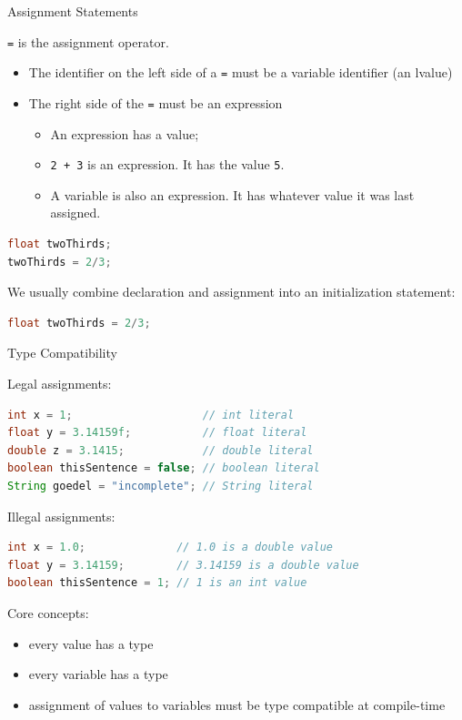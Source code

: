 \documentclass{beamer}
\begin{document}
\begin{frame}[fragile]{Assignment Statements}


{\tt =} is the assignment operator.
\begin{itemize}
\item The identifier on the left side of a {\tt =} must be a variable identifier (an lvalue)
\item The right side of the {\tt =} must be an expression
\begin{itemize}
\item An expression has a value;
\item {\tt 2 + 3} is an expression.  It has the value {\tt 5}.
\item A variable is also an expression.  It has whatever value it was last assigned.
\end{itemize}

\end{itemize}

\begin{lstlisting}[language=Java]
float twoThirds;
twoThirds = 2/3;
\end{lstlisting}
We usually combine declaration and assignment into an initialization statement:
\begin{lstlisting}[language=Java]
float twoThirds = 2/3;
\end{lstlisting}


\end{frame}

\begin{frame}[fragile]{Type Compatibility}


Legal assignments:
\begin{lstlisting}[language=Java]
int x = 1;                    // int literal
float y = 3.14159f;           // float literal
double z = 3.1415;            // double literal
boolean thisSentence = false; // boolean literal
String goedel = "incomplete"; // String literal
\end{lstlisting}

Illegal assignments:
\begin{lstlisting}[language=Java]
int x = 1.0;              // 1.0 is a double value
float y = 3.14159;        // 3.14159 is a double value
boolean thisSentence = 1; // 1 is an int value
\end{lstlisting}


Core concepts:
\begin{itemize}
\item every value has a type
\item every variable has a type
\item assignment of values to variables must be type compatible at compile-time
\end{itemize}

\end{frame}
\end{document}
